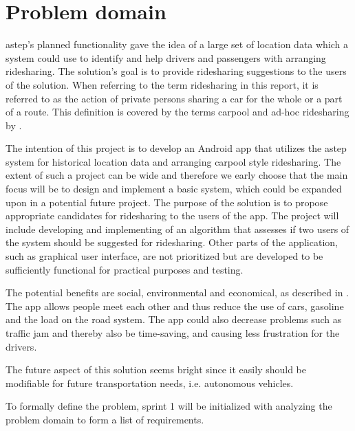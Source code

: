 \section{Problem domain}
\gls{astep}'s planned functionality gave the idea of a large set of location data which a system could use to identify and help drivers and passengers with arranging ridesharing.
The solution's goal is to provide ridesharing suggestions to the users of the solution.
When referring to the term ridesharing in this report, it is referred to as the action of private persons sharing a car for the whole or a part of a route. 
This definition is covered by the terms carpool and ad-hoc ridesharing by \citet{doi:10.1080/01441647.2011.621557}.  

The intention of this project is to develop an Android app that utilizes the \gls{astep} system for historical location data and arranging carpool style ridesharing.
The extent of such a project can be wide and therefore we early choose that the main focus will be to design and implement a basic system, which could be expanded upon in a potential future project.
The purpose of the solution is to propose appropriate candidates for ridesharing to the users of the app.
The project will include developing and implementing of an algorithm that assesses if two users of the system should be suggested for ridesharing.
Other parts of the application, such as graphical user interface, are not prioritized but are developed to be sufficiently functional for practical purposes and testing.

The potential benefits are social, environmental and economical, as described in \cite{doi:10.1080/01441647.2011.621557}.
The app allows people meet each other and thus reduce the use of cars, gasoline and the load on the road system.
The app could also decrease problems such as traffic jam and thereby also be time-saving, and causing less frustration for the drivers.

The future aspect of this solution seems bright since it easily should be modifiable for future transportation needs, i.e. autonomous vehicles.

To formally define the problem, sprint 1 will be initialized with analyzing the problem domain to form a list of requirements.